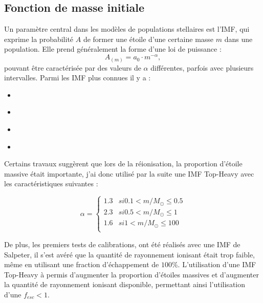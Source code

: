 \subsection{Fonction de masse initiale}
\label{sec:imf}

Un paramètre central dans les modèles de populations stellaires est l'\ac{IMF}, qui exprime la probabilité $A$ de former une étoile d'une certaine masse $m$ dans une population.
Elle prend généralement la forme d'une loi de puissance :
\begin{equation}
A_{(m)} = a_0 \cdot m^{-\alpha},
\end{equation}
pouvant être caractérisée par des valeurs de $\alpha$ différentes, parfois avec plusieurs intervalles.
Parmi les \ac{IMF} plus connues il y a :

\begin{itemize}
\item \cite{1955ApJ...121..161S}
\item \cite{1979ApJS...41..513M}
\item \cite{2001MNRAS.322..231K}
\item \cite{2003PASP..115..763C}
\end{itemize}



Certains travaux \citep{2003MNRAS.344L...7C,2013RPPh...76k2901B} suggèrent que lors de la réionisation, la proportion d'étoile massive était importante, j'ai donc utilisé par la suite une \ac{IMF} Top-Heavy avec les caractéristiques suivantes :

\begin{equation}
	\alpha = 
  	\begin{cases}
	1.3 & si 0.1 < m/M_\odot \leq 0.5\\
	2.3 & si 0.5 < m/M_\odot \leq 1 \\
	1.6 & si 1   < m/M_\odot \leq 100 \\
	\end{cases}
\end{equation} 

De plus, les premiers tests de calibrations, %
ont été réalisés avec une \ac{IMF} de Salpeter, il s'est avéré que la quantité de rayonnement ionisant était trop faible, même en utilisant une fraction d'échappement de $100$\%.
L'utilisation d'une \ac{IMF} Top-Heavy à permis d'augmenter la proportion d'étoiles massives et d'augmenter la quantité de rayonnement ionisant disponible, permettant ainsi l'utilisation d'une $f_{esc}<1$.

